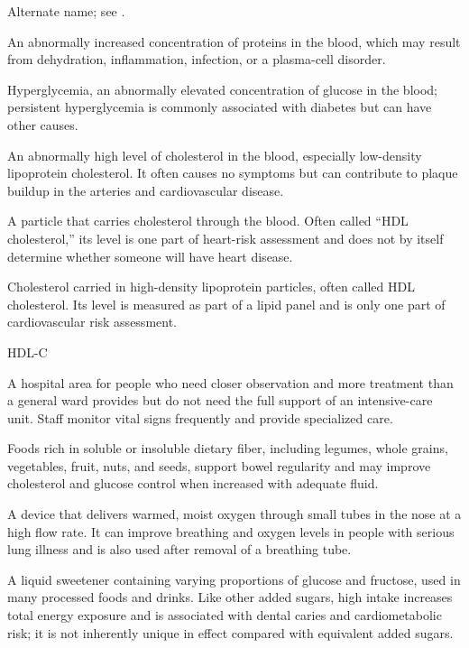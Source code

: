  Alternate name; see .

 An abnormally increased concentration of proteins in the blood, which may result from dehydration, inflammation, infection, or a plasma-cell disorder.

 Hyperglycemia, an abnormally elevated concentration of glucose in the blood; persistent hyperglycemia is commonly associated with diabetes but can have other causes.

 An abnormally high level of cholesterol in the blood, especially low-density lipoprotein cholesterol. It often causes no symptoms but can contribute to plaque buildup in the arteries and cardiovascular disease.

 A particle that carries cholesterol through the blood. Often called “HDL cholesterol,” its level is one part of heart-risk assessment and does not by itself determine whether someone will have heart disease.

 Cholesterol carried in high-density lipoprotein particles, often called HDL cholesterol. Its level is measured as part of a lipid panel and is only one part of cardiovascular risk assessment.

\synonyms
HDL-C

 A hospital area for people who need closer observation and more treatment than a general ward provides but do not need the full support of an intensive-care unit. Staff monitor vital signs frequently and provide specialized care.

 Foods rich in soluble or insoluble dietary fiber, including legumes, whole grains, vegetables, fruit, nuts, and seeds, support bowel regularity and may improve cholesterol and glucose control when increased with adequate fluid.

 A device that delivers warmed, moist oxygen through small tubes in the nose at a high flow rate. It can improve breathing and oxygen levels in people with serious lung illness and is also used after removal of a breathing tube.

 A liquid sweetener containing varying proportions of glucose and fructose, used in many processed foods and drinks. Like other added sugars, high intake increases total energy exposure and is associated with dental caries and cardiometabolic risk; it is not inherently unique in effect compared with equivalent added sugars.

